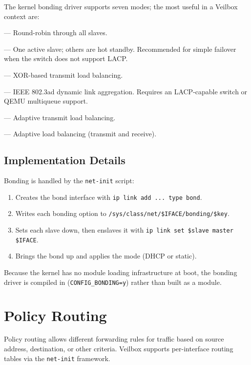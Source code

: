 The kernel bonding driver supports seven modes; the most useful in a
Veilbox context are:

\begin{description}[nosep]
  \item[\texttt{balance-rr} (0)] — Round-robin through all slaves.
  \item[\texttt{active-backup} (1)] — One active slave; others are hot
        standby. Recommended for simple failover when the switch does not
        support LACP.
  \item[\texttt{balance-xor} (2)] — XOR-based transmit load balancing.
  \item[\texttt{802.3ad} (4)] — IEEE 802.3ad dynamic link aggregation.
        Requires an LACP-capable switch or QEMU multiqueue support.
  \item[\texttt{balance-tlb} (5)] — Adaptive transmit load balancing.
  \item[\texttt{balance-alb} (6)] — Adaptive load balancing (transmit and
        receive).
\end{description}

\subsection{Implementation Details}

Bonding is handled by the \texttt{net-init} script:

\begin{enumerate}[nosep]
  \item Creates the bond interface with \texttt{ip link add ... type bond}.
  \item Writes each bonding option to
        \texttt{/sys/class/net/\$IFACE/bonding/\$key}.
  \item Sets each slave down, then enslaves it with
        \texttt{ip link set \$slave master \$IFACE}.
  \item Brings the bond up and applies the mode (DHCP or static).
\end{enumerate}

Because the kernel has no module loading infrastructure at boot, the bonding
driver is compiled in (\texttt{CONFIG\_BONDING=y}) rather than built as a
module.

\section{Policy Routing}

Policy routing allows different forwarding rules for traffic based on source
address, destination, or other criteria. Veilbox supports per-interface
routing tables via the \texttt{net-init} framework.

